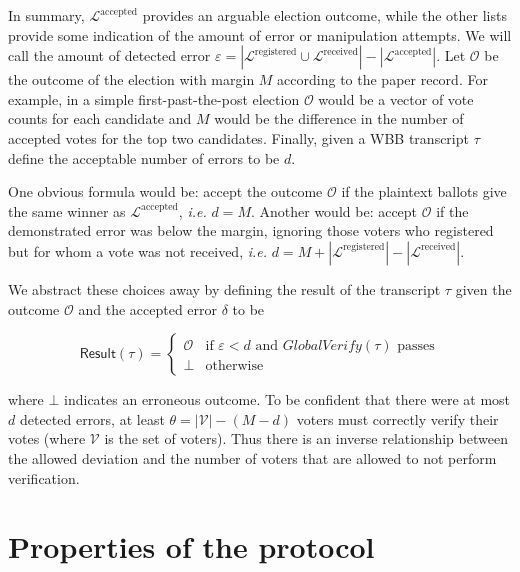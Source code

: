 \documentclass[12pt,a4paper]{article}
\theoremstyle{definition}
\newcommand{\ie}{\textit{i.e. }}
\begin{document}
In summary, $\mathcal{L}^{\text{accepted}}$ provides an arguable election outcome, while the other lists provide some indication of the amount of error or manipulation attempts. We will call the amount of detected error $\varepsilon = |\mathcal{L}^{\text{registered}} \cup \mathcal{L}^{\text{received}}| - |\mathcal{L}^{\text{accepted}}|$. Let $\mathcal{O}$ be the outcome of the election with margin $M$ according to the paper record. For example, in a simple first-past-the-post election $\mathcal{O}$ would be a vector of vote counts for each candidate and $M$ would be the difference in the number of accepted votes for the top two candidates. Finally, given a WBB transcript $\tau$ define the acceptable number of errors to be $d$.

One obvious formula would be: accept the outcome $\mathcal{O}$ if the plaintext ballots give the same winner as $\mathcal{L}^{\text{accepted}}$, \ie $d = M$. Another would be: accept $\mathcal{O}$ if the demonstrated error was below the margin, ignoring those voters who registered but for whom a vote was not received, \ie $d = M + |\mathcal{L}^{\text{registered}}| - |\mathcal{L}^{\text{received}}|$.

We abstract these choices away by defining the result of the transcript $\tau$ given the outcome $\mathcal{O}$ and the accepted error $\delta$ to be

$$\mathsf{Result}(\tau) =
\begin{cases}
    \mathcal{O} & \text{if } \varepsilon < d \text{ and } \mathit{GlobalVerify}(\tau) \text{ passes} \\
    \bot        & \text{otherwise}
\end{cases}$$

where $\bot$ indicates an erroneous outcome. To be confident that there were at most $d$ detected errors, at least $\theta = |\mathcal{V}| - (M - d)$ voters must correctly verify their votes (where $\mathcal{V}$ is the set of voters). Thus there is an inverse relationship between the allowed deviation and the number of voters that are allowed to not perform verification.
\newpage
\section{Properties of the protocol}\label{sec-properties}
\end{document}

